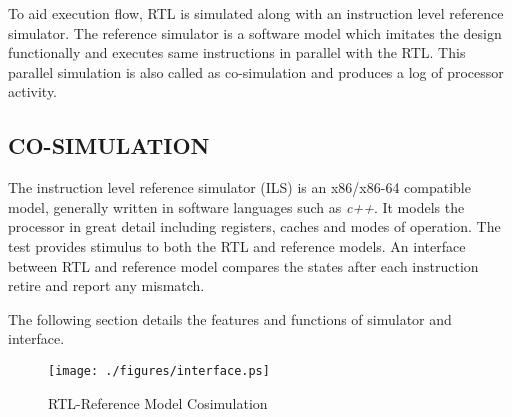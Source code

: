 To aid execution flow, RTL is simulated along with an instruction level reference simulator. The reference simulator is a software model which imitates the design functionally and executes same instructions in parallel with the RTL. This parallel simulation is also called as co-simulation and produces a log of processor activity.


\subsection {CO-SIMULATION}
The instruction level reference simulator (ILS)  is an x86/x86-64 compatible model, generally written in software languages such as {\it c++}. It models the processor in great detail including registers, caches and modes of operation. The test provides stimulus to both the RTL and reference models. An interface between RTL and reference model compares the states after each instruction retire and report any mismatch. 

The following section details the features and functions of simulator and interface. 



\begin{figure}[h]
\centering
\texttt{[image: ./figures/interface.ps]}
\caption{RTL-Reference Model Cosimulation} 
\label{fig:interface.ps}
\end{figure}





